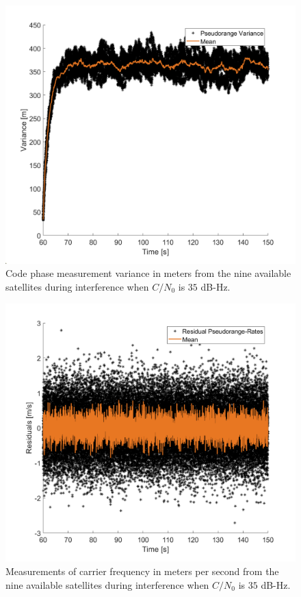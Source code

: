 \documentclass[12pt]{report}
\begin{document}
\begin{figure}[!ht]
  \centering
  \includegraphics[width=0.75\linewidth]{Figures/Results/Scenario1/Case35/codeVariance.png}
  \caption{Code phase measurement variance in meters from the nine available satellites during interference when \(C/N_0\) is \(35\) dB-Hz.}\label{fig:codephaseVariance35}
\end{figure}

\begin{figure}[!ht]
  \centering
  \includegraphics[width=0.75\linewidth]{Figures/Results/Scenario1/Case35/carrierFreq.png}
  \caption{Measurements of carrier frequency in meters per second from the nine available satellites during interference when \(C/N_0\) is \(35\) dB-Hz.}\label{fig:carrier35}
\end{figure}
\end{document}
